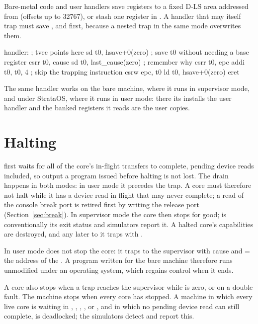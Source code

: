 Bare-metal code and user handlers save registers to a fixed D-LS area addressed from  (offsets
up to 32767), or stash one register in . A handler that may itself trap must save
,  and  first, because a nested trap in the same mode overwrites them.

\begin{asm}
handler:                                ; tvec points here
        sd    t0, hsave+0(zero)         ; save t0 without needing a base register
        csrr  t0, cause
        sd    t0, last_cause(zero)      ; remember why
        csrr  t0, epc
        addi  t0, t0, 4                 ; skip the trapping instruction
        csrw  epc, t0
        ld    t0, hsave+0(zero)
        eret
\end{asm}

The same handler works on the bare machine, where it runs in supervisor mode, and under StrataOS, where
it runs in user mode: there its  installs the user handler and the banked registers it
reads are the user copies.

\section{Halting}\label{sec:halt}

 first waits for all of the core's in-flight transfers to complete, pending device reads
included, so output a program issued before halting is not lost. The drain happens in both modes: in
user mode it precedes the  trap. A core must therefore not halt while it has a device read
in flight that may never complete; a read of the console break port is retired first by writing the
release port (Section~\ref{sec:break}). In supervisor mode the core then stops for good;  is
conventionally its exit status and simulators report it. A halted core's capabilities are destroyed,
and any later  to it traps with .

In user mode  does not stop the core: it traps to the supervisor with cause 
and  = the address of the . A program written for the bare machine therefore runs
unmodified under an operating system, which regains control when it ends.

A core also stops when a trap reaches the supervisor while  is zero, or on a double fault.
The machine stops when every core has stopped. A machine in which every live core is waiting in
, , , ,  or , and in which no
pending device read can still complete, is deadlocked; the simulators detect and report this.

